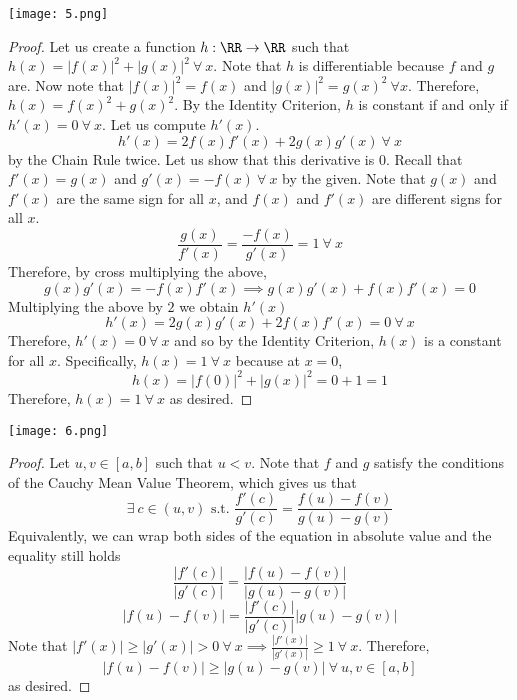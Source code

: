 \documentclass[12pt]{scrartcl}
\begin{document}
\newpage 

\texttt{[image: 5.png]}

\begin{proof}
  
\hfill

Let us create a function $h: \RR \to \RR$ such that $h(x) = |f(x)|^2 + |g(x)|^2 \ \forall \ x$. 
Note that $h$ is differentiable because $f$ and $g$ are. Now 
note that $|f(x)|^2 = f(x)$ and $|g(x)|^2 = g(x)^2 \ \forall x$. Therefore, 
$h(x) = f(x)^2 + g(x)^2$. By the Identity Criterion, $h$ is 
constant if and only if $h'(x) = 0 \ \forall \ x$. Let us compute $h'(x)$. 
\[h'(x) = 2f(x) f'(x) + 2g(x) g'(x) \ \forall \ x\]
by the Chain Rule twice. Let us show that this derivative is $0$.
Recall that $f'(x) = g(x)$ and $g'(x) = -f(x) \ \forall \ x$ by the given. 
Note that $g(x)$ and $f'(x)$ are the same sign for all $x$, and 
$f(x)$ and $f'(x)$ are different signs for all $x$. 
\[\frac{g(x)}{f'(x)} = \frac{-f(x)}{g'(x)} = 1 \ \forall \ x\]
Therefore, by cross multiplying the above,
\[g(x)g'(x) = -f(x)f'(x) \implies g(x)g'(x) + f(x)f'(x) = 0\]
Multiplying the above by $2$ we obtain $h'(x)$
\[h'(x) = 2g(x)g'(x) + 2f(x)f'(x) = 0 \ \forall \ x\]
Therefore, $h'(x) = 0 \ \forall \ x$ and so by the Identity Criterion, $h(x)$ is a constant 
for all $x$. Specifically, $h(x) = 1 \ \forall \ x$ because 
at $x=0$, 
\[h(x) = |f(0)|^2 + |g(x)|^2 = 0 + 1 = 1\]
Therefore, $h(x) = 1 \ \forall \ x$ as desired. 


\end{proof}

\newpage

\texttt{[image: 6.png]}

\begin{proof}
  
\hfill

Let $u, v \in [a,b]$ such that $u < v$. Note that $f$ and $g$ satisfy the conditions of the Cauchy Mean Value Theorem, 
which gives us that 
\[\exists \ c \in (u, v) \text{ s.t. } \frac{f'(c)}{g'(c)} = \frac{f(u) - f(v)}{g(u) - g(v)}\]
Equivalently, we can wrap both sides of the equation in absolute value and the equality still holds
\[\frac{|f'(c)|}{|g'(c)|} = \frac{|f(u) - f(v)|}{|g(u) - g(v)|}\]
\[|f(u) - f(v)| = \frac{|f'(c)|}{|g'(c)|} |g(u) - g(v)|\]
Note that $|f'(x)| \geq |g'(x)| > 0 \ \forall \ x \implies \frac{|f'(x)|}{|g'(x)|} \geq 1 \ \forall \ x$. Therefore, 
\[|f(u) - f(v)| \geq |g(u) - g(v)| \ \forall \ u, v \in [a,b]\] 
as desired.

\end{proof}
\end{document}
